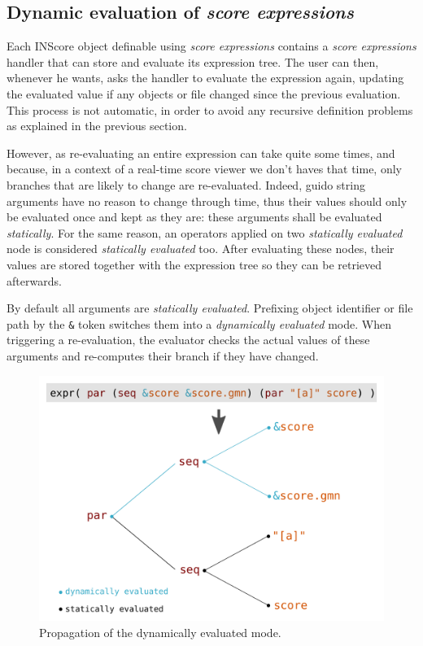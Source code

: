\documentclass{article}
\newcommand{\OSC}[1]{\texttt{#1}}
\newcommand{\sExpr}{\emph{score expressions} }
\begin{document}
\subsection{Dynamic evaluation of \sExpr}

Each INScore object definable using \sExpr contains a \sExpr handler that can store and evaluate  its expression tree. The user can then, whenever he wants, asks the handler to evaluate the expression again, updating the evaluated value if any objects or file changed since the previous evaluation. This process is not automatic, in order to avoid any recursive definition problems as explained in the previous section.

However, as re-evaluating an entire expression can take quite some times, and because, in a context of a real-time score viewer we don't haves that time, only branches that are likely to change are re-evaluated. Indeed, guido string arguments have no reason to change through time, thus their values should only be evaluated once and kept as they are: these arguments shall be evaluated \emph{statically}. For the same reason, an operators applied on two \emph{statically evaluated} node is considered \emph{statically evaluated} too. After evaluating these nodes, their values are stored together with the expression tree so they can be retrieved afterwards.

By default all arguments are \emph{statically evaluated}. Prefixing object identifier or file path by the \OSC{\&} token switches them into a \emph{dynamically evaluated} mode. When triggering a re-evaluation, the evaluator checks the actual values of these arguments and re-computes their branch if they have changed.


\begin{figure}[th]
\centering
\includegraphics[width=1\columnwidth]{imgs/dynamicEval}
\caption{Propagation of the dynamically evaluated mode.
\label{fig:dynamicEval}}
\end{figure}
\end{document}
